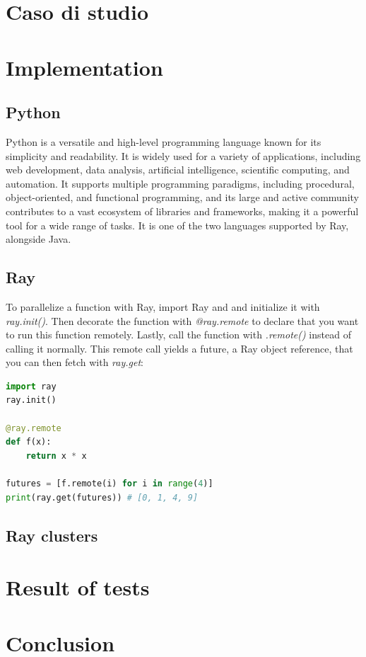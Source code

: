 \pagebreak
\section{Caso di studio}

\section{Implementation}
    \subsection{Python}
    Python is a versatile and high-level programming language known for its simplicity and readability. It is widely used for a variety of applications, including web development, data analysis, artificial intelligence, scientific computing, and automation. It supports multiple programming paradigms, including procedural, object-oriented, and functional programming, and its large and active community contributes to a vast ecosystem of libraries and frameworks, making it a powerful tool for a wide range of tasks. It is one of the two languages supported by Ray, alongside Java.
    
    \subsection{Ray}
    To parallelize a function with Ray, import Ray and and initialize it with \textit{ray.init()}. Then decorate the function with \textit{@ray.remote} to declare that you want to run this function remotely. Lastly, call the function with \textit{.remote()} instead of calling it normally. This remote call yields a future, a Ray object reference, that you can then fetch with \textit{ray.get}:

    \begin{lstlisting}[language=Python]
import ray
ray.init()

@ray.remote
def f(x):
    return x * x

futures = [f.remote(i) for i in range(4)]
print(ray.get(futures)) # [0, 1, 4, 9]
    \end{lstlisting}

\subsection{Ray clusters}

\pagebreak
\section{Result of tests}


\section{Conclusion}

